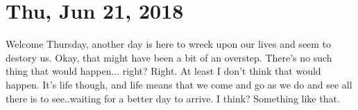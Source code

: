 \section{Thu, Jun 21, 2018}

Welcome Thursday, another day is here to wreck upon our lives and seem to
destory us. Okay, that might have been a bit of an overstep. There's no such
thing that would happen... right? Right. At least I don't think that would
happen. It's life though, and life means that we come and go as we do and see
all there is to see..waiting for a better day to arrive. I think? Something like
that.